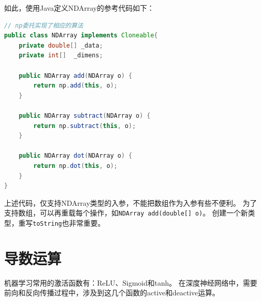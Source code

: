 \noindent
如此，使用Java定义NDArray的参考代码如下：

\begin{lstlisting}[language=Java]
// np委托实现了相应的算法
public class NDArray implements Cloneable{
    private double[] _data;
    private int[]  _dimens;

    public NDArray add(NDArray o) {
        return np.add(this, o);
    }

    public NDArray subtract(NDArray o) {
        return np.subtract(this, o);
    }

    public NDArray dot(NDArray o) {
        return np.dot(this, o);
    }
}
\end{lstlisting}

\noindent
上述代码，仅支持NDArray类型的入参，不能把数组作为入参有些不便利。
为了支持数组，可以再重载每个操作，如\lstinline{NDArray add(double[] o)}。
创建一个新类型，重写\lstinline{toString}也非常重要。

\section{导数运算}
机器学习常用的激活函数有：ReLU、Sigmoid和tanh。
在深度神经网络中，需要前向和反向传播过程中，涉及到这几个函数的active和deactive运算。

